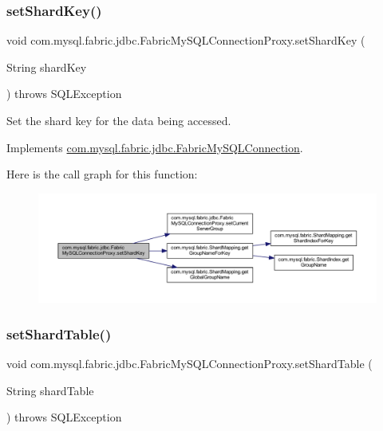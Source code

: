 \subsubsection{\texorpdfstring{set\+Shard\+Key()}{setShardKey()}}
{\footnotesize\ttfamily void com.\+mysql.\+fabric.\+jdbc.\+Fabric\+My\+S\+Q\+L\+Connection\+Proxy.\+set\+Shard\+Key (\begin{DoxyParamCaption}\item[{String}]{shard\+Key }\end{DoxyParamCaption}) throws S\+Q\+L\+Exception}

Set the shard key for the data being accessed. 

Implements \mbox{\hyperlink{interfacecom_1_1mysql_1_1fabric_1_1jdbc_1_1_fabric_my_s_q_l_connection_ab3be2f1efeb29e95c43ef316dd8ce0bf}{com.\+mysql.\+fabric.\+jdbc.\+Fabric\+My\+S\+Q\+L\+Connection}}.

Here is the call graph for this function\+:\nopagebreak
\begin{figure}[H]
\begin{center}
\leavevmode
\includegraphics[width=350pt]{classcom_1_1mysql_1_1fabric_1_1jdbc_1_1_fabric_my_s_q_l_connection_proxy_ace89320543442af9fbe6034a4171333b_cgraph}
\end{center}
\end{figure}
\mbox{\label{classcom_1_1mysql_1_1fabric_1_1jdbc_1_1_fabric_my_s_q_l_connection_proxy_a3dd3f50c8de7678f002bae64114643c3}} 
\subsubsection{\texorpdfstring{set\+Shard\+Table()}{setShardTable()}}
{\footnotesize\ttfamily void com.\+mysql.\+fabric.\+jdbc.\+Fabric\+My\+S\+Q\+L\+Connection\+Proxy.\+set\+Shard\+Table (\begin{DoxyParamCaption}\item[{String}]{shard\+Table }\end{DoxyParamCaption}) throws S\+Q\+L\+Exception}

